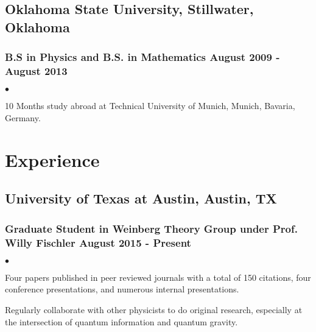 \documentclass[letterpaper]{article}
\renewenvironment{itemize}{
  \begin{list}{$\bullet$}{
    \setlength{\itemsep}{0em}
    \setlength{\parskip}{0em}
    \setlength{\parsep}{0em} 
    \setlength{\topsep}{0em} 
  }
}{
  \end{list}
}
\begin{document}
\subsection*{Oklahoma State University, Stillwater, Oklahoma}
\subsubsection*{B.S in Physics and B.S. in Mathematics \hfill August 2009 - August 2013}

\begin{itemize}
\item 10 Months study abroad at Technical University of Munich, Munich, Bavaria, Germany.
\end{itemize}

\section*{Experience}

\subsection*{University of Texas at Austin, Austin, TX} 
\subsubsection*{Graduate Student in Weinberg Theory Group under Prof. Willy Fischler \hfill August 2015 - Present}
    \begin{itemize}
    
        \item Four papers published in peer reviewed journals with a total of 150 citations, four conference presentations, and numerous internal presentations.
        \item Regularly collaborate with other physicists to do original research, especially at the intersection of quantum information and quantum gravity.
        
    \end{itemize}
    
\end{document}
